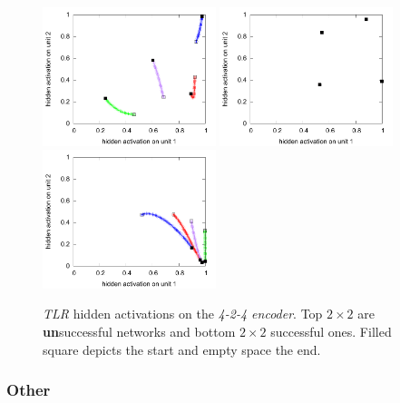 \begin{figure}[h]
  \includegraphics[width=0.45\textwidth]{img/hid-tlr-good-tiny.pdf}  
  \includegraphics[width=0.45\textwidth]{img/hid-tlr-good-init.pdf}  
  \includegraphics[width=0.45\textwidth]{img/hid-tlr-good-weird.pdf}  
  \caption{\emph{TLR} hidden activations on the \emph{4-2-4 encoder}. Top $2\times2$ are {\bf un}successful networks and bottom $2\times2$ successful ones. Filled square depicts the start and empty space the end.}
  \label{fig:results-hidden-activations-tlr}
\end{figure}



\subsubsection{Other} 

